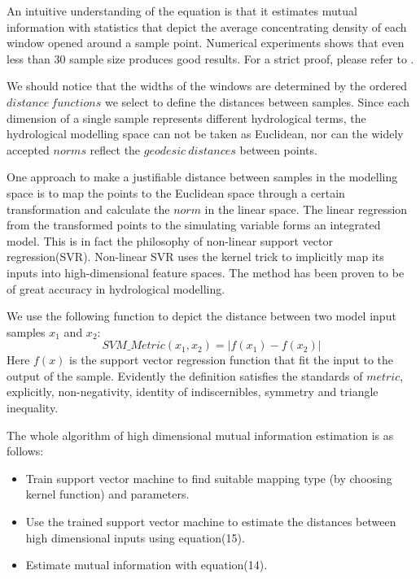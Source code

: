 \documentclass[11pt]{article}
\begin{document}
An intuitive understanding of the equation is that it estimates mutual information with statistics that depict the average concentrating density of each window opened around a sample point. Numerical experiments shows that even less than 30 sample size produces good results. For a strict proof, please refer to \cite{kraskov2004estimating}.

We should notice that the widths of the windows are determined by the ordered $distance~functions$ we select to define the distances between samples. Since each dimension of a single sample represents different hydrological terms, the hydrological modelling space can not be taken as Euclidean, nor can the widely accepted $norms$ reflect the $geodesic      ~distances$ between points. 
 
 
One approach to make a justifiable distance between samples in the modelling space is to map the points to the Euclidean space through a certain transformation and calculate the $norm$ in the linear space. The linear regression from the transformed points to the simulating variable forms an integrated model. This is in fact the philosophy of non-linear support vector regression(SVR). Non-linear SVR uses the kernel trick to implicitly map its inputs into high-dimensional feature spaces. The method has been proven to be of great accuracy in hydrological modelling\cite{dibike2001model,lin2006using,asefa2006multi,behzad2009generalization,phdgong}.

We use the following function to depict the distance between two model input samples $x_1$ and $x_2$:
\begin{equation}
SVM\_Metric(x_1,x_2)=|f(x_1)-f(x_2)|
\end{equation}
Here $f(x)$ is the support vector regression function that fit the input to the output of the sample.   
Evidently the definition satisfies the standards of $metric$, explicitly, non-negativity, identity of indiscernibles, symmetry and triangle inequality.

The whole algorithm of high dimensional mutual information estimation is as follows:
\begin{itemize}
\item Train support vector machine to find suitable mapping type (by choosing kernel function) and parameters.
\item Use the trained support vector machine to estimate the distances between high dimensional inputs using equation(15).
\item Estimate mutual information with equation(14).
\end{itemize}
\end{document}
